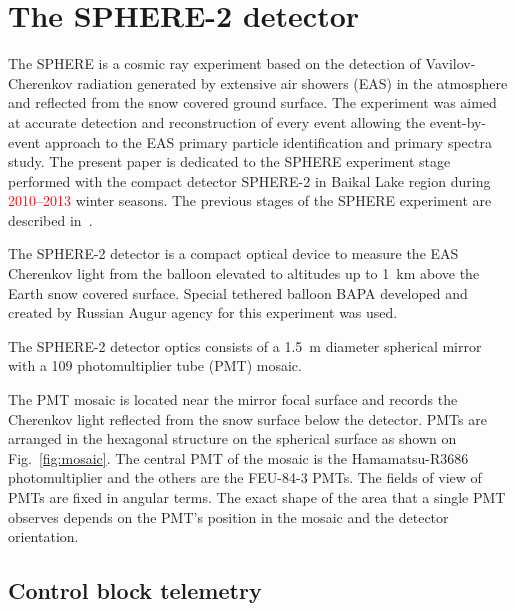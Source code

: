 \documentclass[final,5p,times,twocolumn]{elsarticle}
\begin{document}


\section{The SPHERE-2 detector \label{sect:detector}}

The SPHERE is a cosmic ray experiment based on the detection of Vavilov-Cherenkov radiation generated by extensive air showers (EAS) in the atmosphere and reflected from the snow covered ground surface. The experiment was aimed at accurate detection and reconstruction of every event allowing the event-by-event approach to the EAS primary particle identification and primary spectra study. The present paper is dedicated to the SPHERE experiment stage performed with the compact detector SPHERE-2 in Baikal Lake region during \textcolor{red}{2010--2013} winter seasons. The previous stages of the SPHERE experiment are described in~\cite{Ant15a}. %

The \mbox{SPHERE-2} detector is a compact optical device to measure the EAS Cherenkov light from the balloon elevated to altitudes up to 1~km above the Earth snow covered surface. Special tethered balloon BAPA developed and created by Russian Augur agency for this experiment was used.

The \mbox{SPHERE-2} detector optics consists of a 1.5~m diameter spherical mirror with a 109 photomultiplier tube (PMT) mosaic. 

The PMT mosaic is located near the mirror focal surface and records the Cherenkov light reflected from the snow surface below the detector. PMTs are arranged in the hexagonal structure on the spherical surface as shown on Fig.~\ref{fig:mosaic}. The central PMT of the mosaic is the Hamamatsu-R3686 photomultiplier and the others are the FEU-84-3 PMTs. The fields of view of PMTs are fixed in angular terms. The exact shape of the area that a single PMT observes depends on the PMT's position in the mosaic and the detector orientation.


\subsection{Control block telemetry}
\end{document}
